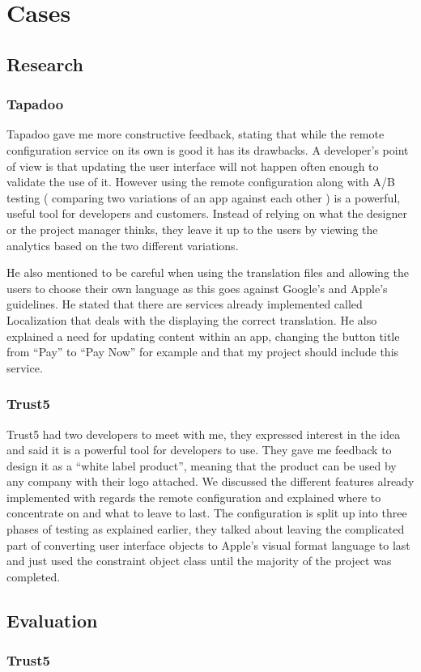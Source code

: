 \chapter{Cases}

\section{Research}

\subsection{Tapadoo}
Tapadoo \cite{tapadoo} gave me more constructive feedback, stating that while the remote configuration service on its own is good it has its drawbacks. A developer's point of view is that updating the user interface will not happen often enough to validate the use of it. However using the remote configuration along with A/B testing ( comparing two variations of an app against each other ) is a powerful, useful tool for developers and customers. Instead of relying on what the designer or the project manager thinks, they leave it up to the users by viewing the analytics based on the two different variations.

He also mentioned to be careful when using the translation files and allowing the users to choose their own language as this goes against Google’s and Apple’s guidelines. He stated that there are services already implemented called Localization that deals with the displaying the correct translation. He also explained a need for updating content within an app, changing the button title from “Pay” to “Pay Now” for example and that my project should include this service.

\subsection{Trust5}

Trust5 \cite{trust5} had two developers to meet with me, they expressed interest in the idea and said it is a powerful tool for developers to use. They gave me feedback to design it as a “white label product”, meaning that the product can be used by any company with their logo attached. We discussed the different features already implemented with regards the remote configuration and explained where to concentrate on and what to leave to last. The configuration is split up into three phases of testing as explained earlier, they talked about leaving the complicated part of converting user interface objects to Apple’s visual format language to last and just used the constraint object class until the majority of the project was completed.

\section{Evaluation}

\subsection{Trust5}